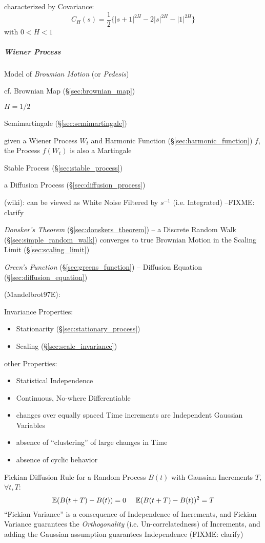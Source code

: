 characterized by Covariance:
\[
  C_H(s) = \frac{1}{2} \{ |s+1|^{2H} - 2|s|^{2H} - |1|^{2H} \}
\]
with $0 < H < 1$



\subparagraph{Wiener Process}\label{sec:wiener_process}\hfill

Model of \emph{Brownian Motion} (or \emph{Pedesis})

\fist cf. Brownian Map (\S\ref{sec:brownian_map})

$H = 1/2$

Semimartingale (\S\ref{sec:semimartingale})

given a Wiener Process $W_t$ and Harmonic Function
(\S\ref{sec:harmonic_function}) $f$, the Process $f(W_t)$ is also a Martingale

Stable Process (\S\ref{sec:stable_process})

a Diffusion Process (\S\ref{sec:diffusion_process})

(wiki):
can be viewed as White Noise Filtered by $s^{-1}$ (i.e. Integrated)
--FIXME: clarify

\emph{Donsker's Theorem} (\S\ref{sec:donskers_theorem}) -- a Discrete Random
Walk (\S\ref{sec:simple_random_walk}) converges to true Brownian Motion in the
Scaling Limit (\S\ref{sec:scaling_limit})

\emph{Green's Function} (\S\ref{sec:greens_function}) -- Diffusion Equation
(\S\ref{sec:diffusion_equation})

(Mandelbrot97E):

Invariance Properties:
\begin{itemize}
  \item Stationarity (\S\ref{sec:stationary_process})
  \item Scaling (\S\ref{sec:scale_invariance})
\end{itemize}

other Properties:
\begin{itemize}
  \item Statistical Independence
  \item Continuous, No-where Differentiable
  \item changes over equally spaced Time increments are Independent Gaussian
    Variables
  \item absence of ``clustering'' of large changes in Time
  \item absence of cyclic behavior
\end{itemize}

Fickian Diffusion Rule for a Random Process $B(t)$ with Gaussian Increments $T$,
$\forall t, T$:
\[
  \expect(B(t+T) - B(t)) = 0 \ \ \ \ \expect(B(t+T) - B(t))^2 = T
\]
``Fickian Variance'' is a consequence of Independence of Increments, and Fickian
Variance guarantees the \emph{Orthogonality} (i.e. Un-correlatedness) of
Increments, and adding the Gaussian assumption guarantees Independence (FIXME:
clarify)



